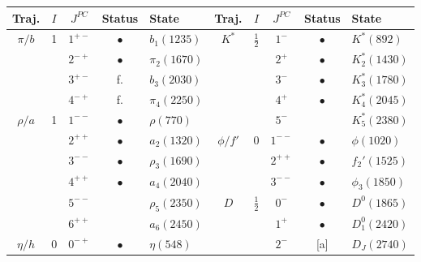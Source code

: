 \documentclass[11pt,a4]{article}
\begin{document}
\begin{table}[t!] \centering

	\begin{tabular}{|c|c|c|c|l|c|c|c|c|l|} \hline
		Traj. & \(I\) & \(J^{PC}\) & Status & State & Traj. & \(I\) & \(J^{PC}\) & Status & State \\ \hline
		
		\(\pi/b\) & 1&\(1^{+-}\) & \(\bullet\) & \(b_1(1235)\) 			     &	\(K^*\) &\(\frac{1}{2}\)&	\(1^-\) & \(\bullet\) & \(K^*(892)\)  \\

		          & &\(2^{-+}\) &  \(\bullet\) & \(\pi_2(1670)\)				            &&		& \(2^+\) & \(\bullet\) & \(K^*_2(1430)\) \\

		          & &\(3^{+-}\) & f. & \(b_3(2030)\)  				   &&& \(3^-\) & \(\bullet\) & \(K^*_3(1780)\) \\

							& &\(4^{-+}\) & f. & \(\pi_4(2250)\)				            &	&			& \(4^+\) & \(\bullet\) & \(K^*_4(2045)\) \\ \cline{1-5}

		\(\rho/a\)& 1&\(1^{--}\) & \(\bullet\) & \(\rho(770)\)  					          &	&			& \(5^-\) & & \(K^*_5(2380)\) \\ \cline{6-10}

							& &\(2^{++}\) & \(\bullet\) & \(a_2(1320)\) 		   &\(\phi/f'\) &0& \(1^{--}\) & \(\bullet\) & \(\phi(1020)\) \\

							& &\(3^{--}\) & \(\bullet\) &\(\rho_3(1690)\) &				            &	& \(2^{++}\) & \(\bullet\) & \(f_2'(1525)\) \\

							& &\(4^{++}\) & \(\bullet\) & \(a_4(2040)\) & 			            &	& \(3^{--}\) & \(\bullet\) & \(\phi_3(1850)\) \\ \cline{6-10}

							& &\(5^{--}\) && \(\rho_5(2350)\) &				    \(D\)   &\(\frac{1}{2}\)& \(0^-\) & \(\bullet\) & \(D^{0}(1865)\) \\

							& &\(6^{++}\) && \(a_6(2450)\) &				            &	& \(1^+\) & \(\bullet\) & \(D^0_1(2420)\) \\ \cline{1-5}

		\(\eta/h\)& 0&\(0^{-+}\) & \(\bullet\) & \(\eta(548)\) &				            &	& \(2^-\) & [a] & \(D_J(2740)\) \\ \cline{6-9}


\end{tabular}
\end{table}
\end{document}
